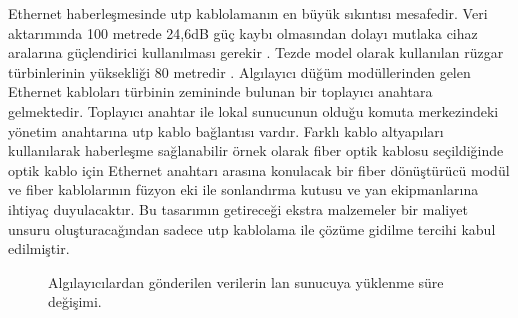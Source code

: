 Ethernet haberleşmesinde \gls{utp} kablolamanın en büyük sıkıntısı mesafedir. 
Veri aktarımında 100 metrede 24,6dB güç kaybı olmasından dolayı mutlaka cihaz aralarına güçlendirici kullanılması gerekir \cite{yilmazanalysis}. Tezde model olarak kullanılan rüzgar türbinlerinin yüksekliği 80 metredir \cite{bauer_2010}.
Algılayıcı düğüm modüllerinden gelen Ethernet kabloları türbinin zemininde bulunan bir toplayıcı anahtara gelmektedir. Toplayıcı anahtar ile lokal sunucunun olduğu komuta merkezindeki yönetim anahtarına \gls{utp} kablo bağlantısı vardır. Farklı kablo altyapıları kullanılarak haberleşme sağlanabilir örnek olarak fiber optik kablosu seçildiğinde optik kablo için Ethernet anahtarı arasına konulacak bir fiber dönüştürücü modül ve fiber kablolarının füzyon eki ile sonlandırma kutusu ve yan ekipmanlarına ihtiyaç duyulacaktır. Bu tasarımın getireceği ekstra malzemeler bir maliyet unsuru oluşturacağından sadece \gls{utp} kablolama ile çözüme gidilme tercihi kabul edilmiştir.

\begin{figure}[htbp]
\centering



\caption{Algılayıcılardan gönderilen verilerin \gls{lan} sunucuya yüklenme süre değişimi.}
\label{fig:4-13}
\end{figure}


